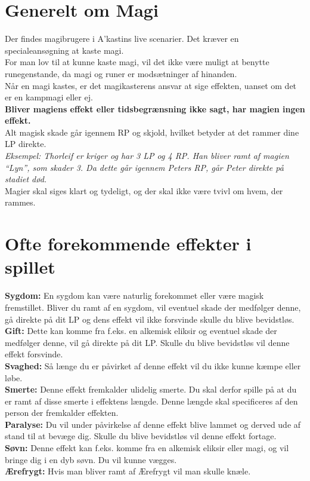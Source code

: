 \section{Generelt om Magi}
Der findes magibrugere i A’kastins live scenarier. Det kræver en specialeansøgning at kaste magi.\\
For man lov til at kunne kaste magi, vil det ikke være muligt at benytte runegenstande, da magi og runer er modsætninger af hinanden.\\
Når en magi kastes, er det magikasterens ansvar at sige effekten, uanset om det er en kampmagi eller ej.\\ 
\textbf{Bliver magiens effekt eller tidsbegrænsning ikke sagt, har magien ingen effekt.}\\
Alt magisk skade går igennem RP og skjold, hvilket betyder at det rammer dine LP direkte.\\
\textit{Eksempel: Thorleif er kriger og har 3 LP og 4 RP. Han bliver ramt af magien “Lyn”, som skader 3. Da dette går igennem Peters RP, går Peter direkte på stadiet død.}\\
Magier skal siges klart og tydeligt, og der skal ikke være tvivl om hvem, der rammes.\\

\section{Ofte forekommende effekter i spillet}
\textbf{Sygdom:} En sygdom kan være naturlig forekommet eller være magisk fremstillet. Bliver du ramt af en sygdom, vil eventuel skade der medfølger denne, gå direkte på dit LP og dens effekt vil ikke forsvinde skulle du blive bevidstløs.\\
\textbf{Gift:} Dette kan komme fra f.eks. en alkemisk eliksir og eventuel skade der medfølger denne, vil gå direkte på dit LP. Skulle du blive bevidstløs vil denne effekt forsvinde.\\
\textbf{Svaghed:} Så længe du er påvirket af denne effekt vil du ikke kunne kæmpe eller løbe.\\
\textbf{Smerte:} Denne effekt fremkalder ulidelig smerte. Du skal derfor spille på at du er ramt af disse smerte i effektens længde. Denne længde skal specificeres af den person der fremkalder effekten.\\
\textbf{Paralyse:} Du vil under påvirkelse af denne effekt blive lammet og derved ude af stand til at bevæge dig. Skulle du blive bevidstløs vil denne effekt fortage.\\
\textbf{Søvn:} Denne effekt kan f.eks. komme fra en alkemisk eliksir eller magi, og vil bringe dig i en dyb søvn. Du vil kunne vægges.\\
\textbf{Ærefrygt:} Hvis man bliver ramt af Ærefrygt vil man skulle knæle.\\